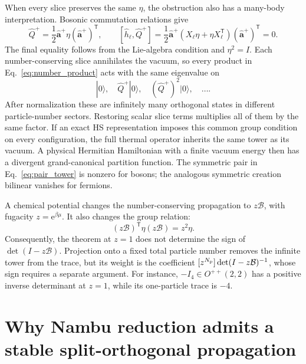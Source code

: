 \documentclass[11pt,a4paper]{article}
\newcommand{\ee}{\mathrm{e}}
\newcommand{\trans}{\mathsf{T}}
\newcommand{\mc}[1]{\mathcal{#1}}
\newcommand{\bb}[1]{\bm{#1}}
\begin{document}
When every slice preserves the same $\eta$, the obstruction also has a
many-body interpretation. Bosonic commutation relations give
\begin{equation}
    \hat Q^{+}=\frac12\hat{\bb a}^{+}
                       \eta(\hat{\bb a}^{+})^\trans,
    \qquad
    [\hat h_\ell,\hat Q^{+}]
    =\frac12\hat{\bb a}^{+}
      (X_\ell\eta+\eta X_\ell^\trans)
      (\hat{\bb a}^{+})^\trans=0.
    \label{eq:pair_tower}
\end{equation}
The final equality follows from the Lie-algebra condition and $\eta^2=I$.
Each number-conserving slice annihilates the vacuum, so every product in
Eq.~\eqref{eq:number_product} acts with the same eigenvalue on
\begin{equation}
    |0\rangle,\quad
    \hat Q^{+}|0\rangle,\quad
    (\hat Q^{+})^2|0\rangle,\quad\ldots .
    \label{eq:tower_states}
\end{equation}
After normalization these are infinitely many orthogonal states in
different particle-number sectors. Restoring scalar slice terms multiplies
all of them by the same factor. If an exact HS representation imposes
this common group condition on every configuration, the full thermal
operator inherits the same tower as its vacuum. A physical Hermitian
Hamiltonian with a finite vacuum energy then has a divergent grand-canonical
partition function. The symmetric pair in Eq.~\eqref{eq:pair_tower} is
nonzero for bosons; the analogous symmetric creation bilinear vanishes
for fermions.

A chemical potential changes the number-conserving propagation to
$z\mc B$, with fugacity $z=\ee^{\beta\mu}$. It also changes the group relation:
\begin{equation}
    (z\mc B)^\trans\eta(z\mc B)=z^2\eta.
    \label{eq:fugacity}
\end{equation}
Consequently, the theorem at $z=1$ does not determine the sign of
$\det(I-z\mc B)$. Projection onto a fixed total particle number removes
the infinite tower from the trace, but its weight is the coefficient
$[z^{N_{\rm p}}]\det(I-z\mc B)^{-1}$, whose sign requires a separate argument.
For instance, $-I_4\in O^{++}(2,2)$ has a positive inverse determinant
at $z=1$, while its one-particle trace is $-4$.

\section{Why Nambu reduction admits a stable split-orthogonal propagation}
\end{document}
